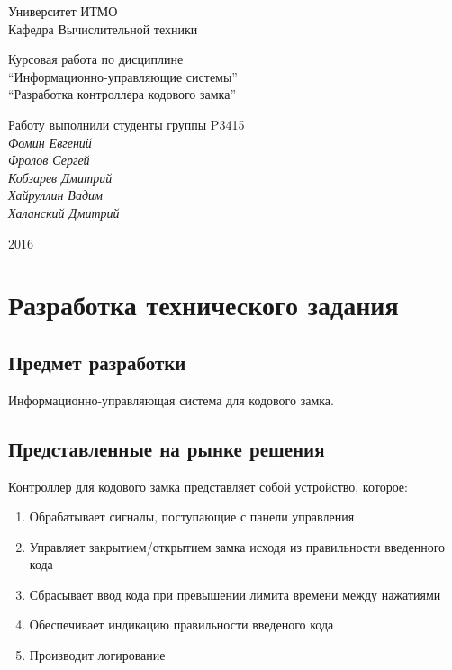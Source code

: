 \documentclass[12pt, a4paper] {article}
\begin{document}
\thispagestyle{empty}
\begin{center}
  {\large
    Университет ИТМО \\
    Кафедра Вычислительной техники \\
  }
\end{center}
\begin{center}
  Курсовая работа по дисциплине\\
  {\large
    ``Информационно-управляющие системы''\\
    ``Разработка контроллера кодового замка''\\
  }
\end{center}
\begin{flushright}
  Работу выполнили студенты группы P3415\\
  {\it Фомин Евгений\\
    Фролов Сергей \\
    Кобзарев Дмитрий \\
    Хайруллин Вадим \\
    Халанский Дмитрий \\
  }
\end{flushright}
\begin{center}
  2016 
\end{center}
\newpage

\section{Разработка технического задания}
\subsection{Предмет разработки}
Информационно-управляющая система для кодового замка.
\subsection{Представленные на рынке решения}
Контроллер для кодового замка представляет собой устройство, которое:
\begin{enumerate}
  \item Обрабатывает сигналы, поступающие с панели управления
  \item Управляет закрытием/открытием замка исходя из правильности введенного кода
  \item Сбрасывает ввод кода при превышении лимита времени между нажатиями
  \item Обеспечивает индикацию правильности введеного кода
  \item Производит логирование
\end{enumerate}
\end{document}
